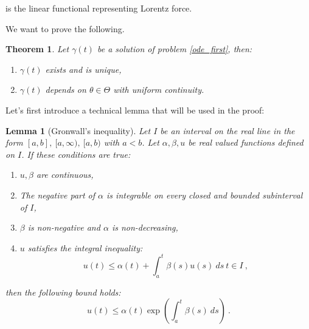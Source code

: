 \documentclass{article}
\newtheorem{lemma}{Lemma}
\newtheorem{thm}{Theorem}
\begin{document}
	is the linear functional representing Lorentz force.
	
	We want to prove the following.
	
	\begin{thm} \label{thm:ode_continuity}
		Let $\gamma(t)$ be a solution of problem \eqref{ode_first}, then:
		\begin{enumerate}
			\item $\gamma(t)$ exists and is unique,
			\item $\gamma(t)$ depends on $\theta \in \Theta$ with uniform continuity.
		\end{enumerate}	
	\end{thm}
	
	Let's first introduce a technical lemma that will be used in the proof:
	
	\begin{lemma}[Gronwall's inequality]
		Let $I$ be an interval on the real line in the form $[a,b], \ [a, \infty), \ [a, b)$ with $a < b$. Let $\alpha, \beta, u$ be real valued functions defined on $I$. If these conditions are true:
		\begin{enumerate}
			\item $u, \beta$ are continuous,
			\item The negative part of $\alpha$ is integrable on every closed and bounded subinterval of $I$,
			\item $\beta$ is non-negative and $\alpha$ is non-decreasing,
			\item $u$ satisfies the integral inequality:
			$$u(t) \leq \alpha(t) + \int_a^t \beta(s) u(s) \ ds \ t \in I \ ,$$
		\end{enumerate}
		then the following bound holds:
		\begin{equation}
			u(t) \leq \alpha(t) \exp \left( \int_a^t \beta(s) \ ds \right) \ .
		\end{equation}
	\end{lemma}
	
\end{document}
